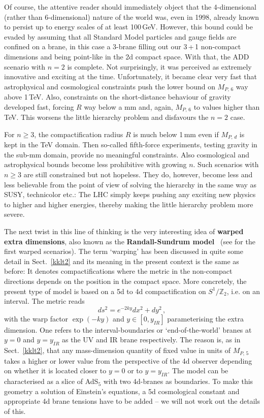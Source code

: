 \documentclass[12pt]{article}
\newcommand{\be}{\begin{equation}}
\newcommand{\ee}{\end{equation}}
\numberwithin{equation}{section}
\begin{document}
Of course, the attentive reader should immediately object that the 4-dimensional (rather than 6-dimensional) nature of the world was, even in 1998, already known to persist up to energy scales of at least 100$\,$GeV. However, this bound could be evaded by assuming that all Standard Model particles and gauge fields are confined on a brane, in this case a 3-brane filling out our 3$\,$+$\,$1 non-compact dimensions and being point-like in the 2d compact space. With that, the ADD scenario with $n=2$ is complete. Not surprisingly, it was perceived as extremely innovative and exciting at the time. Unfortunately, it became clear very fast that astrophysical and cosmological  constraints push the lower bound on $M_{P,\,6}$ way above 1$\,$TeV. Also, constraints on the short-distance behaviour of gravity developed fast, forcing $R$ way below a mm and, again, $M_{P,\,6}$ to values higher than TeV. This worsens the little hierarchy problem and disfavours the $n=2$ case. 

For $n\ge 3$, the compactification radius $R$ is much below 1$\,$mm even if $M_{P,\,d}$ is kept in the TeV domain. Then so-called fifth-force experiments, testing gravity in the sub-mm domain, provide no meaningful constraints. Also cosmological and astrophysical bounds become less prohibitive with growing $n$. Such scenarios with $n\ge 3$ are still constrained but not hopeless. They do, however, become less and less believable from the point of view of solving the hierarchy in the same way as SUSY, technicolor etc.: The LHC simply keeps pushing any exciting new physics to higher and higher energies, thereby making the little hierarchy problem more severe.

The next twist in this line of thinking is the very interesting idea of {\bf warped extra dimensions}, also known as the {\bf Randall-Sundrum model}~\cite{Randall:1999ee, Randall:1999vf} (see \cite{Rubakov:1983bz} for the first warped scenarios). The term `warping' has been discussed in quite some detail in Sect.~\ref{kklt2} and its meaning in the present context is the same as before: It denotes compactifications where the metric in the non-compact directions depends on the position in the compact space. More concretely, the present type of model is based on a 5d to 4d compactification on $S^1/\mathbb{Z}_2$, i.e. on an interval. The metric reads
\be
ds^2=e^{-2ky}dx^2+dy^2\,,
\ee
with the warp factor $\exp(-ky)$ and $y\in [0,y_{I\!R}]$ parameterising the extra dimension. One refers to the interval-boundaries or `end-of-the-world' branes at $y=0$ and $y=y_{I\!R}$ as the UV and IR brane respectively. The reason is, as in Sect.~\ref{kklt2}, that any mass-dimension quantity of fixed value in units of $M_{P,\,5}$ takes a higher or lower value from the perspective of the 4d observer depending  on whether it is located closer to $y=0$ or to $y=y_{I\!R}$. The model can be characterised as a slice of AdS$_5$ with two 4d-branes as boundaries. To make this geometry a solution of Einstein's equations, a 5d cosmological constant and appropriate 4d brane tensions have to be added -- we will not work out the details of this.
\end{document}
